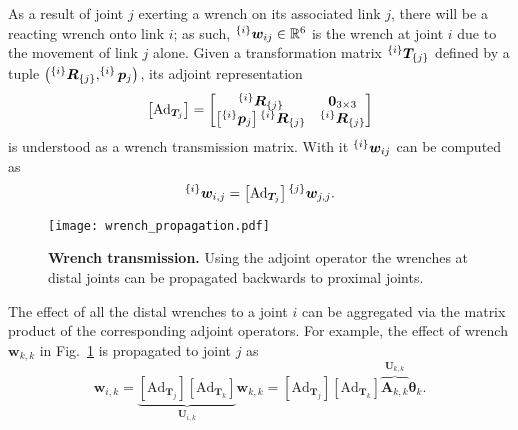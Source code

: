 As a result of joint $j$ exerting a wrench on its associated link $j$, there will be a reacting wrench onto link $i$; as such, $^{\left\lbrace i \right\rbrace}\bm{w}_{ij} \in \mathbb{R}^6$ is the wrench at joint $i$ due to the movement of link $j$ alone. Given a transformation matrix $^{\left\lbrace i \right\rbrace}\bm{T}_{\left\lbrace j \right\rbrace}$ defined by a tuple $\left(^{\left\lbrace i \right\rbrace}\bm{R}_{\left\lbrace j \right\rbrace},^{\left\lbrace i \right\rbrace}\bm{p}_j\right)$, its adjoint representation \cite{Lynch2017Modernrobotics}
\begin{equation}
	\left[\text{Ad}_{\bm{T}_j}\right] =  
	\begin{bmatrix}
		^{\left\lbrace i \right\rbrace}\bm{R}_{\left\lbrace j \right\rbrace} & \bm{0}_{3\times 3} \\
		\left[^{\left\lbrace i \right\rbrace}\bm{p}_j\right]{}^{\left\lbrace i \right\rbrace}\bm{R}_{\left\lbrace j \right\rbrace} & ^{\left\lbrace i \right\rbrace}\bm{R}_{\left\lbrace j \right\rbrace}
	\end{bmatrix}
\end{equation}
is understood as a wrench transmission matrix. With it $^{\left\lbrace i \right\rbrace}\bm{w}_{ij}$ can be computed as
\begin{equation}
		^{\left\lbrace i \right\rbrace}\bm{w}_{i,j}= \left[\text{Ad}_{\bm{T}_j}\right]{}^{\left\lbrace j \right\rbrace}\bm{w}_{j,j}.
\end{equation}

\begin{figure}[t!]
	\begin{center}
		\texttt{[image: wrench\_propagation.pdf]}
		\caption{\textbf{Wrench transmission.} Using the adjoint operator the wrenches at distal joints can be propagated backwards to proximal joints.}
		\label{fig:wrench_propagation}
	\end{center}
\end{figure}
The effect of all the distal wrenches to a joint $i$ can be aggregated via the matrix product of the corresponding adjoint operators. For example, the effect of wrench $\bm{w}_{k,k}$ in Fig.~\ref{fig:wrench_propagation} is propagated to joint $j$ as
\begin{equation}
	\bm{w}_{i,k} = \underbrace{\left[\text{Ad}_{\bm{T}_{j}}\right]\left[\text{Ad}_{\bm{T}_{k}}\right]}_{\bm{U}_{i,k}}\bm{w}_{k,k} = \left[\text{Ad}_{\bm{T}_{j}}\right]\left[\text{Ad}_{\bm{T}_{k}}\right]\overbrace{\bm{A}_{k,k}}^{\bm{U}_{k,k}}\bm{\theta}_k.
	\label{eq:ext_wrench}
\end{equation}

